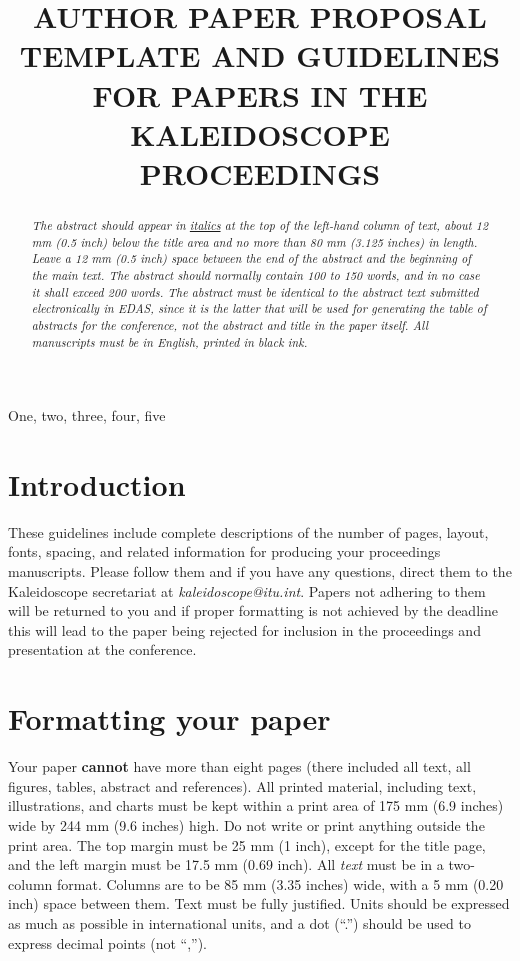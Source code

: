 \documentclass[a4paper]{article}
\title{AUTHOR PAPER PROPOSAL TEMPLATE AND GUIDELINES \\ 
       FOR PAPERS IN THE KALEIDOSCOPE PROCEEDINGS}
\begin{document}
\pagestyle{plain}

%
\maketitle
%
\begin{abstract} \em
The abstract should appear in \underline{italics} at the top of the
left-hand column of text, about 12 mm (0.5 inch) below the title area
and no more than 80 mm (3.125 inches) in length.  Leave a 12 mm (0.5
inch) space between the end of the abstract and the beginning of the
main text.  The abstract should normally contain 100 to 150 words, and
in no case it shall exceed 200 words. The abstract must be identical
to the abstract text submitted electronically in EDAS, since it is the
latter that will be used for generating the table of abstracts for the
conference, not the abstract and title in the paper itself.  All
manuscripts must be in English, printed in black ink.
\end{abstract}
%
\begin{keywords}
One, two, three, four, five
\end{keywords}
%
\section{Introduction}
\label{sec:intro}

These guidelines include complete descriptions of the number of pages,
layout, fonts, spacing, and related information for producing your
proceedings manuscripts. Please follow them and if you have any
questions, direct them to the Kaleidoscope secretariat at
{\em kaleidoscope@itu.int}. Papers not adhering to them will be returned to
you and if proper formatting is not achieved by the deadline this will
lead to the paper being rejected for inclusion in the proceedings and
presentation at the conference.

\section{Formatting your paper}
\label{sec:format}

Your paper {\bf cannot} have more than eight pages (there included all
text, all figures, tables, abstract and references). All printed
material, including text, illustrations, and charts must be kept
within a print area of 175 mm (6.9 inches) wide by 244 mm (9.6 inches)
high. Do not write or print anything outside the print area. The top
margin must be 25 mm (1 inch), except for the title page, and the left
margin must be 17.5 mm (0.69 inch).  All {\it text} must be in a
two-column format. Columns are to be 85 mm (3.35 inches) wide, with a
5 mm (0.20 inch) space between them. Text must be fully
justified. Units should be expressed as much as possible in
international units, and a dot (``.'') should be used to express
decimal points (not ``,'').
\end{document}
